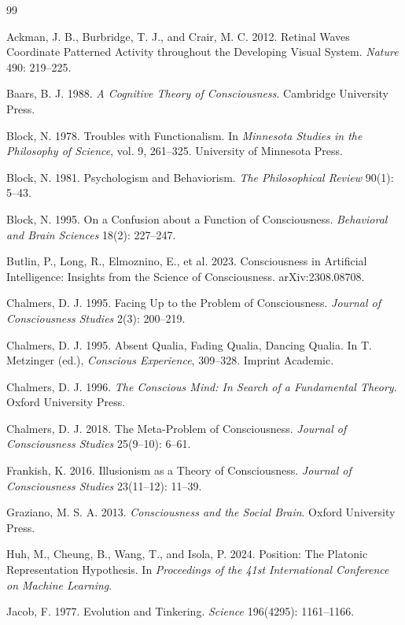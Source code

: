 \documentclass[11pt]{article}
\begin{document}
\begin{thebibliography}{99}
\small

 Ackman, J. B., Burbridge, T. J., and Crair, M. C. 2012. Retinal Waves Coordinate Patterned Activity throughout the Developing Visual System. \emph{Nature} 490: 219--225.

 Baars, B. J. 1988. \emph{A Cognitive Theory of Consciousness}. Cambridge University Press.

 Block, N. 1978. Troubles with Functionalism. In \emph{Minnesota Studies in the Philosophy of Science}, vol. 9, 261--325. University of Minnesota Press.

 Block, N. 1981. Psychologism and Behaviorism. \emph{The Philosophical Review} 90(1): 5--43.

 Block, N. 1995. On a Confusion about a Function of Consciousness. \emph{Behavioral and Brain Sciences} 18(2): 227--247.

 Butlin, P., Long, R., Elmoznino, E., et al. 2023. Consciousness in Artificial Intelligence: Insights from the Science of Consciousness. arXiv:2308.08708.

 Chalmers, D. J. 1995. Facing Up to the Problem of Consciousness. \emph{Journal of Consciousness Studies} 2(3): 200--219.

 Chalmers, D. J. 1995. Absent Qualia, Fading Qualia, Dancing Qualia. In T. Metzinger (ed.), \emph{Conscious Experience}, 309--328. Imprint Academic.

 Chalmers, D. J. 1996. \emph{The Conscious Mind: In Search of a Fundamental Theory}. Oxford University Press.

 Chalmers, D. J. 2018. The Meta-Problem of Consciousness. \emph{Journal of Consciousness Studies} 25(9--10): 6--61.

 Frankish, K. 2016. Illusionism as a Theory of Consciousness. \emph{Journal of Consciousness Studies} 23(11--12): 11--39.

 Graziano, M. S. A. 2013. \emph{Consciousness and the Social Brain}. Oxford University Press.

 Huh, M., Cheung, B., Wang, T., and Isola, P. 2024. Position: The Platonic Representation Hypothesis. In \emph{Proceedings of the 41st International Conference on Machine Learning}.

 Jacob, F. 1977. Evolution and Tinkering. \emph{Science} 196(4295): 1161--1166.


\end{thebibliography}
\end{document}
